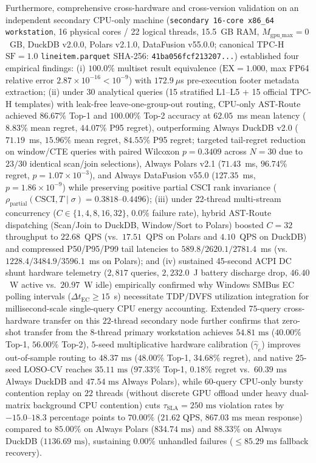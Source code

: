 \documentclass[10pt,a4paper]{article}
\begin{document}
Furthermore, comprehensive cross-hardware and cross-version validation on an independent secondary CPU-only machine (\texttt{secondary 16-core x86\_64 workstation}, 16 physical cores / 22 logical threads, 15.5~GB RAM, $M_{\text{gpu\_max}}=0$~GB, DuckDB v2.0.0, Polars v2.1.0, DataFusion v55.0.0; canonical TPC-H $\text{SF}=1.0$ \texttt{lineitem.parquet} SHA-256: \texttt{41ba056fcf213207...}) established four empirical findings: (i) $100.0\%$ multiset result equivalence ($\text{EX}=1.000$, max FP64 relative error $2.87\times 10^{-16} < 10^{-9}$) with $172.9~\mu$s pre-execution footer metadata extraction; (ii) under 30 analytical queries (15 stratified L1--L5 + 15 official TPC-H templates) with leak-free leave-one-group-out routing, CPU-only AST-Route achieved $86.67\%$ Top-1 and $100.00\%$ Top-2 accuracy at $62.05$~ms mean latency ($8.83\%$ mean regret, $44.07\%$ P95 regret), outperforming Always DuckDB v2.0 ($71.19$~ms, $15.96\%$ mean regret, $84.55\%$ P95 regret; targeted tail-regret reduction on window/CTE queries with paired Wilcoxon $p=0.3409$ across $N=30$ due to $23/30$ identical scan/join selections), Always Polars v2.1 ($71.43$~ms, $96.74\%$ regret, $p=1.07\times 10^{-3}$), and Always DataFusion v55.0 ($127.35$~ms, $p=1.86\times 10^{-9}$) while preserving positive partial CSCI rank invariance ($\rho_{\text{partial}}(\text{CSCI}, T \mid \sigma) = 0.3818\text{--}0.4496$); (iii) under 22-thread multi-stream concurrency ($C \in \{1,4,8,16,32\}$, $0.0\%$ failure rate), hybrid AST-Route dispatching (Scan/Join to DuckDB, Window/Sort to Polars) boosted $C=32$ throughput to $22.68$~QPS (vs.\ $17.51$~QPS on Polars and $4.10$~QPS on DuckDB) and compressed P50/P95/P99 tail latencies to $589.8/2620.1/2781.4$~ms (vs.\ $1228.4/3484.9/3596.1$~ms on Polars); and (iv) sustained 45-second ACPI DC shunt hardware telemetry ($2,817$ queries, $2,232.0$~J battery discharge drop, $46.40$~W active vs.\ $20.97$~W idle) empirically confirmed why Windows SMBus EC polling intervals ($\Delta t_{\text{EC}} \ge 15$~s) necessitate TDP/DVFS utilization integration for millisecond-scale single-query CPU energy accounting. Extended $75$-query cross-hardware transfer on this $22$-thread secondary node further confirms that zero-shot transfer from the $8$-thread primary workstation achieves $54.81\text{ ms}$ ($40.00\%$ Top-1, $56.00\%$ Top-2), $5$-seed multiplicative hardware calibration ($\hat{\gamma}_e$) improves out-of-sample routing to $48.37\text{ ms}$ ($48.00\%$ Top-1, $34.68\%$ regret), and native $25$-seed LOSO-CV reaches $35.11\text{ ms}$ ($97.33\%$ Top-1, $0.18\%$ regret vs.\ $60.39\text{ ms}$ Always DuckDB and $47.54\text{ ms}$ Always Polars), while $60$-query CPU-only bursty contention replay on $22$ threads (without discrete GPU offload under heavy dual-matrix background CPU contention) cuts $\tau_{\text{SLA}}=250\text{ ms}$ violation rates by $-15.0\text{--}18.3$ percentage points to $70.00\%$ ($21.62\text{ QPS}$, $867.03\text{ ms}$ mean response) compared to $85.00\%$ on Always Polars ($834.74\text{ ms}$) and $88.33\%$ on Always DuckDB ($1136.69\text{ ms}$), sustaining $0.00\%$ unhandled failures ($\le 85.29\text{ ms}$ fallback recovery).
\end{document}
